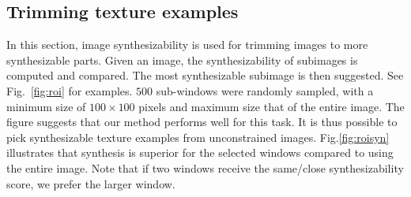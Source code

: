 \documentclass[10pt,twocolumn,letterpaper]{article}
\begin{document}




\subsection{Trimming texture examples}
In this section, image synthesizability is used for trimming images to
more synthesizable parts. Given an image, the synthesizability of
subimages is computed and compared. The most synthesizable subimage is
then suggested. See Fig.~\ref{fig:roi} for examples. $500$ sub-windows
were randomly sampled, with a minimum size of $100 \times 100$ pixels
and maximum size that of the entire image.  The figure suggests that
our method performs well for this task. It is thus possible to pick
synthesizable texture examples from unconstrained images.
Fig.\ref{fig:roisyn} illustrates that synthesis is superior for the
selected windows compared to using the entire image.  Note that if two
windows receive the same/close synthesizability score, we prefer the
larger window.


\end{document}
